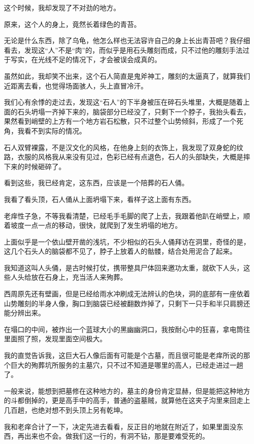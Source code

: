 这个时候，我却发现了不对劲的地方。

原来，这个人的身上，竟然长着绿色的青苔。

无论是什么东西，除了乌龟，他怎么样也无法容许自己的身上长出青苔吧？我仔细看去，发现这“人”不是“肉”的，而似乎是用石头雕刻而成，只不过他的雕刻手法过于写实，在光线不足的情况下，才会被误会成真的。

虽然如此，我却笑不出来，这个石人简直是鬼斧神工，雕刻的太逼真了，就算我们近距离去看，也觉得场面骇人，头上直冒冷汗。

我们心有余悸的走过去，发现这“石人”的下半身被压在碎石头堆里，大概是随着上面的石头坍塌一齐掉下来的，脑袋部分已经没了，只剩下一个脖子，我抬头看去，果然看到峭壁的上方有一个地方岩石松散，只不过整个山势倾斜，形成了一个死角，我看不到实际的情况。

石人双臂裸露，不是汉文化的风格，在他身上刻的衣饰上，我发现了双身蛇的纹路，衣服的风格我从来没有见过，色彩已经有点退色，石人的头部缺失，大概是摔下来的时候砸碎了。

看到这些，我已经肯定，这东西，应该是一个陪葬的石人俑。

我看了看头顶，石人俑从上面坍塌下来，看样子这上面有东西。

老痒性子急，不等我看清楚，已经毛手毛脚的爬了上去，我跟着他趴在峭壁上，顺着坡度一点一点的移动，很快，就爬到了发生坍塌的地方。

上面似乎是一个依山壁开凿的浅坑，不少相似的石头人俑拜访在洞里，奇怪的是，这几个石头人的脑袋都不见了，脖子上放着人的骷髅，结合处用泥合了起来。

我知道这叫人头俑，是古时候打仗，携带整具尸体回来邀功太重，就砍下人头，这些人头给放在石身上，充当活人来殉葬。

西周原先还有壁画，但是已经给雨水冲刷成无法辨认的色块，洞的底部有一座依着山势雕刻的半身人像，胸口到脑袋已经被翻数炸掉了，只剩下一只手和半只肩膀还能分辨出来。

在塌口的中间，被炸出一个蓝球大小的黑幽幽洞口，我按耐心中的狂喜，拿电筒往里面照了照，发现里面空间极大。

我的直觉告诉我，这巨大石人像后面有可能是个古墓，而且很可能是老痒所说的那个巨大的殉葬坑所服务的主墓穴，只不过不知道是哪里的高人，已经走进过一趟了。

一般来说，能想到把墓修在这种地方的，墓主的身份肯定显赫，但是能把这种地方的斗都倒掉的，更是高手中的高手，普通的盗墓贼，就算他在这夹子沟里来回走上几百趟，也绝对想不到头顶上另有乾坤。

我和老痒合计了一下，决定先进去看看，反正目的地就在附近了，如果里面没东西，再出来也不会。做我们这一行的，有洞不钻，那是要难受死的。

